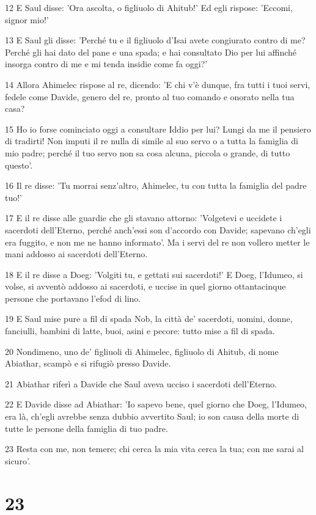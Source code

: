 \par 12 E Saul disse: 'Ora ascolta, o figliuolo di Ahitub!' Ed egli rispose: 'Eccomi, signor mio!'
\par 13 E Saul gli disse: 'Perché tu e il figliuolo d'Isai avete congiurato contro di me? Perché gli hai dato del pane e una spada; e hai consultato Dio per lui affinché insorga contro di me e mi tenda insidie come fa oggi?'
\par 14 Allora Ahimelec rispose al re, dicendo: 'E chi v'è dunque, fra tutti i tuoi servi, fedele come Davide, genero del re, pronto al tuo comando e onorato nella tua casa?
\par 15 Ho io forse cominciato oggi a consultare Iddio per lui? Lungi da me il pensiero di tradirti! Non imputi il re nulla di simile al suo servo o a tutta la famiglia di mio padre; perché il tuo servo non sa cosa alcuna, piccola o grande, di tutto questo'.
\par 16 Il re disse: 'Tu morrai senz'altro, Ahimelec, tu con tutta la famiglia del padre tuo!'
\par 17 E il re disse alle guardie che gli stavano attorno: 'Volgetevi e uccidete i sacerdoti dell'Eterno, perché anch'essi son d'accordo con Davide; sapevano ch'egli era fuggito, e non me ne hanno informato'. Ma i servi del re non vollero metter le mani addosso ai sacerdoti dell'Eterno.
\par 18 E il re disse a Doeg: 'Volgiti tu, e gettati sui sacerdoti!' E Doeg, l'Idumeo, si volse, si avventò addosso ai sacerdoti, e uccise in quel giorno ottantacinque persone che portavano l'efod di lino.
\par 19 E Saul mise pure a fil di spada Nob, la città de' sacerdoti, uomini, donne, fanciulli, bambini di latte, buoi, asini e pecore: tutto mise a fil di spada.
\par 20 Nondimeno, uno de' figliuoli di Ahimelec, figliuolo di Ahitub, di nome Abiathar, scampò e si rifugiò presso Davide.
\par 21 Abiathar riferì a Davide che Saul aveva ucciso i sacerdoti dell'Eterno.
\par 22 E Davide disse ad Abiathar: 'Io sapevo bene, quel giorno che Doeg, l'Idumeo, era là, ch'egli avrebbe senza dubbio avvertito Saul; io son causa della morte di tutte le persone della famiglia di tuo padre.
\par 23 Resta con me, non temere; chi cerca la mia vita cerca la tua; con me sarai al sicuro'.

\chapter{23}

